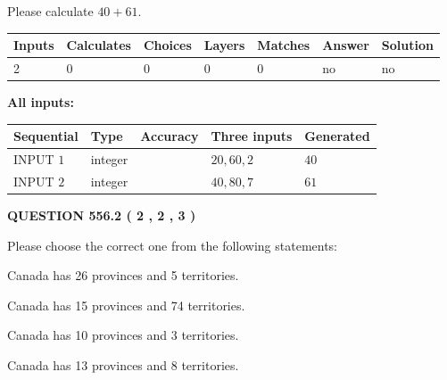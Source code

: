 \documentclass[12pt]{article}
\begin{document}
  
 
Please calculate $ %
40 +  %
61 $.
 
 
   
   
   
   
\noindent\begin{tabular}{|l|l|l|l|l|l|l|}
 \hline
Inputs & Calculates & Choices & Layers & Matches & Answer & Solution \\ \hline
 2  & 
 0  & 
 0
  & 
 0  & 
 0  & 
  no & 
  no 
  \\ \hline
 \end{tabular}
   
   
   
   
\noindent{}
   
   
   
   
\noindent\vspace{0.1in}\hspace{-0.08in} {\textbf{\Large{All inputs: }}}
   
   
  
  
\noindent\begin{tabular}{|l|l|l|l|l|}
\hline
 Sequential & Type & Accuracy & Three inputs & Generated \\ 
\hline
 
 
  INPUT $  1 $ & integer &  & $
 20
 , 
 60
 , 
 2
 $ & $ 40 $ 
 \\  \hline  
 
 
  INPUT $  2 $ & integer &  & $
 40
 , 
 80
 , 
 7
 $ & $ 61 $ 
 \\  \hline  
 \end{tabular}
   
   
  
\vspace{0.2in}
  
{\textbf{\Large{QUESTION
556.2 
 ( 2 , 2 , 3 )
}}}
  
  
Please choose the correct one from the following statements:
 
 
Canada has  26 provinces and  5 territories.
 
 
Canada has  15 provinces and  74 territories.
 
 
Canada has 10  provinces and 3 territories.
 
 
Canada has  13 provinces and  8 territories.
 
\end{document}
